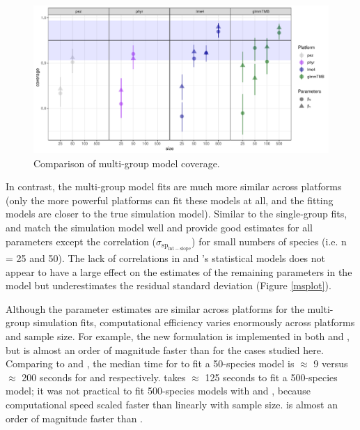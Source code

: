 \documentclass[12pt]{article}
\begin{document}
\begin{center}
\begin{figure}[H]
  \includegraphics[scale=0.7]{./figure/mscoverage.pdf}
  \caption{Comparison of multi-group model coverage.}
  \label{msplot_coverage}
\end{figure}
\end{center}

In contrast, the multi-group model fits are much more similar across platforms (only the more powerful platforms can fit these models at all, and the fitting models are closer to the true simulation model).
Similar to the single-group fits,  and  match the simulation model well and provide good estimates for all parameters except the correlation ($\sigma_{\mathrm{sp_{int-slope}}}$) for small numbers of species (i.e. n = 25 and 50).
The lack of correlations in  and 's statistical models does not appear to have a large effect on the estimates of the remaining parameters in the model but underestimates the residual standard deviation (Figure \ref{msplot}).

Although the parameter estimates are similar across platforms for the multi-group simulation fits, computational efficiency varies enormously across platforms and sample size.
For example, the new formulation is implemented in both  and , but  is almost an order of magnitude faster than  for the cases studied here.
Comparing  to  and , the median time for  to fit a 50-species model is $\approx$ 9 versus $\approx$ 200 seconds for  and  respectively. 
 takes $\approx$ 125 seconds to fit a 500-species model; it was not practical to fit 500-species models with  and , because computational speed scaled faster than linearly with sample size.
 is almost an order of magnitude faster than .
\end{document}
